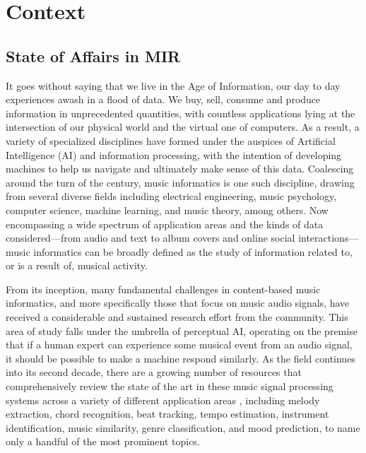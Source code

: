 

\graphicspath{{2/figures/}}

\chapter{Context}
\label{chp:context}



\section{State of Affairs in MIR}

It goes without saying that we live in the Age of Information, our day to day experiences awash in a flood of data.
We buy, sell, consume and produce information in unprecedented quantities, with countless applications lying at the intersection of our physical world and the virtual one of computers.
As a result, a variety of specialized disciplines have formed under the auspices of Artificial Intelligence (AI) and information processing, with the intention of developing machines to help us navigate and ultimately make sense of this data.
Coalescing around the turn of the century, music informatics is one such discipline, drawing from several diverse fields including electrical engineering, music psychology, computer science, machine learning, and music theory, among others.
Now encompassing a wide spectrum of application areas and the kinds of data considered---from audio and text to album covers and online social interactions---music informatics can be broadly defined as the study of information related to, or is a result of, musical activity.

From its inception, many fundamental challenges in content-based music informatics, and more specifically those that focus on music audio signals, have received a considerable and sustained research effort from the community.
This area of study falls under the umbrella of perceptual AI, operating on the premise that if a human expert can experience some musical event from an audio signal, it should be possible to make a machine respond similarly.
As the field continues into its second decade, there are a growing number of resources that comprehensively review the state of the art in these music signal processing systems across a variety of different application areas  \cite{Klapuri2006,Casey2008,Mueller2011a}, including melody extraction, chord recognition, beat tracking, tempo estimation, instrument identification, music similarity, genre classification, and mood prediction, to name only a handful of the most prominent topics.


